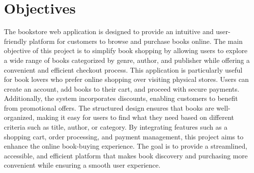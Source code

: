 \section{Objectives}

The bookstore web application is designed to provide an intuitive and user-friendly platform for customers to browse and purchase books online. The main objective of this project is to simplify book shopping by allowing users to explore a wide range of books categorized by genre, author, and publisher while offering a convenient and efficient checkout process.
This application is particularly useful for book lovers who prefer online shopping over visiting physical stores. Users can create an account, add books to their cart, and proceed with secure payments. Additionally, the system incorporates discounts, enabling customers to benefit from promotional offers. The structured design ensures that books are well-organized, making it easy for users to find what they need based on different criteria such as title, author, or category.
By integrating features such as a shopping cart, order processing, and payment management, this project aims to enhance the online book-buying experience. The goal is to provide a streamlined, accessible, and efficient platform that makes book discovery and purchasing more convenient while ensuring a smooth user experience.